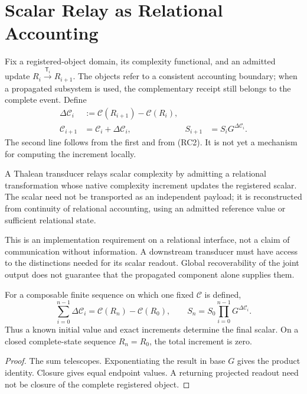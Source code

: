 \begingroup
\renewcommand{\thesection}{11A}
\section{Scalar Relay as Relational Accounting}\label{sec:scalarrelay}
Fix a registered-object domain, its complexity functional, and an admitted update $R_i\xrightarrow{\mathsf T_i}R_{i+1}$. The objects refer to a consistent accounting boundary; when a propagated subsystem is used, the complementary receipt still belongs to the complete event. Define
\begin{equation}
\begin{aligned}
\Delta\mathcal C_i&:=\mathcal C(R_{i+1})-\mathcal C(R_i),\\
\mathcal C_{i+1}&=\mathcal C_i+\Delta\mathcal C_i,
& S_{i+1}&=S_iG^{\Delta\mathcal C_i}.
\end{aligned}
\tag{RC3}\label{eq:scalarrelay}
\end{equation}
The second line follows from the first and from (RC2). It is not yet a mechanism for computing the increment locally.

\begin{definition}
A Thalean transducer relays scalar complexity by admitting a relational transformation whose native complexity increment updates the registered scalar. The scalar need not be transported as an independent payload; it is reconstructed from continuity of relational accounting, using an admitted reference value or sufficient relational state.
\end{definition}
This is an implementation requirement on a relational interface, not a claim of communication without information. A downstream transducer must have access to the distinctions needed for its scalar readout. Global recoverability of the joint output does not guarantee that the propagated component alone supplies them.

\begin{proposition}\label{prop:scalarcomposition}
For a composable finite sequence on which one fixed $\mathcal C$ is defined,
\begin{equation}
\sum_{i=0}^{n-1}\Delta\mathcal C_i=\mathcal C(R_n)-\mathcal C(R_0),
\qquad
S_n=S_0\prod_{i=0}^{n-1}G^{\Delta\mathcal C_i}.
\tag{RC4}\label{eq:scalartelescope}
\end{equation}
Thus a known initial value and exact increments determine the final scalar. On a closed complete-state sequence $R_n=R_0$, the total increment is zero.
\end{proposition}
\begin{proof}
The sum telescopes. Exponentiating the result in base $G$ gives the product identity. Closure gives equal endpoint values. A returning projected readout need not be closure of the complete registered object.
\end{proof}

